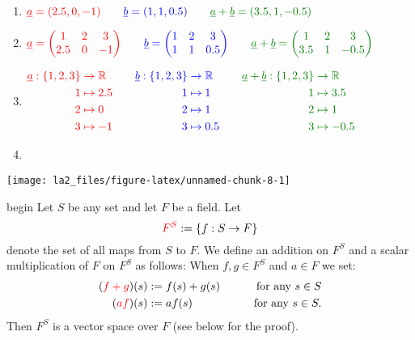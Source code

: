 \documentclass[
  12pt,
  a4paper,
  twoside]{article}
\theoremstyle{plain}
\theoremstyle{definition}
\begin{document}
\begin{enumerate}
\def\labelenumi{(\Roman{enumi})}
\setcounter{enumi}{1}
\item
  \({\color{red}{\underline{a} = (2.5,0,-1)}} \qquad {\color{blue}{\underline{b} = (1,1,0.5)}} \qquad {\color{green}{\underline{a}+\underline{b} = (3.5,1,-0.5)}}\)
\item
  \({\color{red}{\underline{a} = \begin{pmatrix} 1 & 2 & 3 \\ 2.5 & 0 & -1 \end{pmatrix}}} \qquad {\color{blue}{\underline{b} = \begin{pmatrix} 1 & 2 & 3 \\ 1 & 1 & 0.5 \end{pmatrix}}} \qquad {\color{green}{\underline{a}+\underline{b} = \begin{pmatrix} 1 & 2 & 3 \\ 3.5 & 1 & -0.5 \end{pmatrix}}}\)
\item
  \(\begin{aligned} {\color{red}{\underline{a}: \{ 1,2,3}} & {\color{red}{\} \to \mathbb{R}}} & \quad {\color{blue}{\underline{b}: \{ 1,2,3}} & {\color{blue}{\} \to \mathbb{R}}} & \quad {\color{green}{\underline{a}+\underline{b}: \{ 1,2,3}} & {\color{green}{\} \to \mathbb{R}}} \\ & {\color{red}{1 \mapsto 2.5}} & & {\color{blue}{1 \mapsto 1}} & & {\color{green}{1 \mapsto 3.5}} \\ & {\color{red}{2 \mapsto 0}} & & {\color{blue}{2 \mapsto 1}} & & {\color{green}{2 \mapsto 1}} \\ & {\color{red}{3 \mapsto -1}} & & {\color{blue}{3 \mapsto 0.5}} & & {\color{green}{3 \mapsto -0.5}} \end{aligned}\)
\item
\end{enumerate}

\begin{center}\texttt{[image: la2\_files/figure-latex/unnamed-chunk-8-1]} \end{center}

\csname begin\label{cnj:expl-mother}
Let \(S\) be any set and let \(F\) be a field. Let
\[ {\color{red}{F^S}} := \{ f: S \to F \} \]
denote the set of all maps from \(S\) to \(F\).
We define an addition on \(F^{S}\) and a scalar multiplication of \(F\) on \(F^{S}\) as follows:
When \(f,g \in F^{S}\) and \(a \in F\) we set:
\[ \begin{aligned} ({\color{red}{f+g}})(s) & := f(s) + g(s) \qquad & \text{for any } s \in S \\
({\color{red}{af}})(s) & := af(s) & \text{for any } s \in S. \end{aligned} \]
Then \(F^{S}\) is a vector space over \(F\) (see below for the proof).
\end{document}
